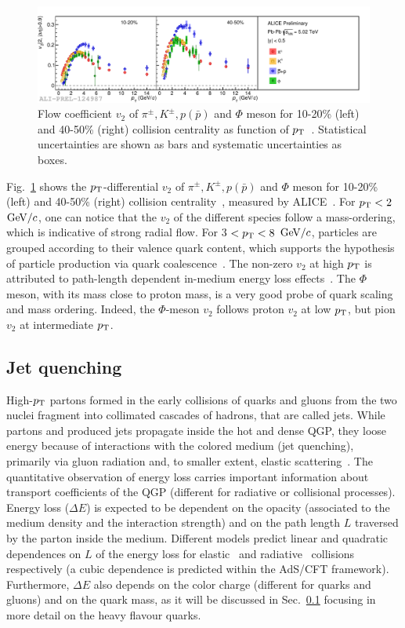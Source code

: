 \begin{figure}[!ht]
  \centering
  \includegraphics[width=15cm]{FigCap1/v2IdentifiedParticles.pdf}
  \caption{Flow coefficient $v_2$ of $\pi^{\pm}, K^{\pm}, p(\bar{p})$ and $\Phi$ meson for 10-20\% (left) and 40-50\% (right)
collision centrality as function of $p_{\rm T}$~\cite{Bertens:2017krr}. Statistical uncertainties are shown as bars and systematic uncertainties as boxes.}
  \label{fig:v2IdentifiedParticles}
\end{figure}
Fig.~\ref{fig:v2IdentifiedParticles} shows the $p_{\rm T}$-differential $v_2$ of $\pi^{\pm}, K^{\pm}, p(\bar{p})$ and $\Phi$ meson for 10-20\% (left)
and 40-50\% (right) collision centrality~\cite{Bertens:2017krr}, measured by ALICE~\cite{Bertens:2017krr}.
For $p_{\rm T} < 2$ $\mathrm{GeV}/c$, one can notice that the $v_2$ of the different species follow a mass-ordering, which is indicative of strong radial flow.
For 3 $< p_{\rm T} < 8$ $\mathrm{GeV}/c$, particles are grouped according to their valence quark content, which supports the
hypothesis of particle production via quark coalescence~\cite{Molnar:2003ff}. The non-zero $v_2$ at high $p_{\rm T}$ is attributed to path-length dependent in-medium energy loss effects~\cite{Gyulassy:2000gk}. The $\Phi$ meson, with its mass close to proton mass, is a very good probe of quark scaling and mass ordering. Indeed, the $\Phi$-meson $v_2$ follows proton $v_2$ at low $p_{\rm T}$, but pion $v_2$ at intermediate $p_{\rm T}$. \\

\subsection{Jet quenching}
High-$p_{\rm T}$ partons formed in the early collisions of quarks and gluons from the two nuclei fragment into collimated cascades of hadrons, that are called jets. 
While partons and produced jets propagate inside the hot and dense QGP, they loose energy because of interactions with the colored medium (jet quenching), primarily via gluon radiation and, to smaller extent, elastic scattering~\cite{Qin:2015srf}. The quantitative observation of energy loss carries important information about transport coefficients of the QGP (different for radiative or collisional processes). Energy loss ($\Delta E$) is expected to be dependent on the opacity (associated to the medium density and the interaction strength) and on the path length $L$ traversed by the parton inside the medium. Different models predict linear and quadratic dependences on $L$ of the energy loss for elastic~\cite{Thoma:1990fm} and radiative~\cite{Baier:1996sk} collisions respectively (a cubic dependence is predicted within the AdS/CFT framework). Furthermore, $\Delta E$ also depends on the color charge (different for quarks and gluons) and on the quark mass, as it will be discussed in Sec.~\ref{} focusing in more detail on the heavy flavour quarks.

